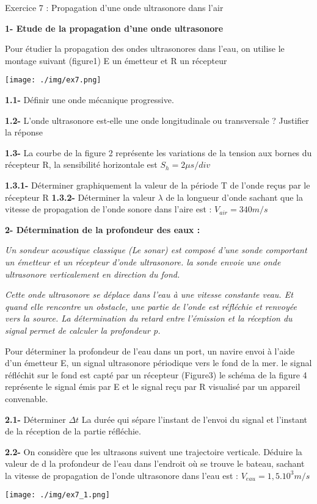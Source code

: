 \documentclass[12pt, french]{article}
\begin{document}
\begin{Box2}{Exercice 7 : Propagation d’une onde ultrasonore dans l’air }

\textbf{1- Etude de la propagation d’une onde ultrasonore\dotfill}

Pour étudier la propagation des ondes ultrasonores dans l’eau, on utilise le montage suivant (figure1) E un émetteur et R un récepteur

\begin{center}
	\texttt{[image: ./img/ex7.png]}
  \end{center}

\textbf{1.1- }Définir une onde mécanique progressive.

\textbf{1.2- }L’onde ultrasonore est-elle une onde longitudinale ou transversale ? Justifier la réponse

\textbf{1.3- }La courbe de la figure 2 représente les variations de la tension aux bornes du récepteur R, la sensibilité horizontale est $S_h=2\mu{s}/div$

\textbf{1.3.1- }Déterminer graphiquement la valeur de la période T de l’onde reçus par le récepteur R
\textbf{1.3.2- }Déterminer la valeur $\lambda$ de la longueur d’onde sachant que la vitesse de propagation de l’onde sonore dans l’aire est : $V_{air}=340m/s$

\textbf{2- Détermination de la profondeur des eaux :\dotfill}

\emph{Un sondeur acoustique classique (Le sonar) est composé d’une sonde comportant un émetteur et un récepteur d’onde ultrasonore. la sonde envoie une onde ultrasonore verticalement en direction du
fond.}

\emph{Cette onde ultrasonore se déplace dans l’eau à une vitesse constante veau. Et quand elle
rencontre un obstacle, une partie de l’onde est réfléchie et renvoyée vers la source. La détermination du retard entre l’émission et la réception du signal permet de calculer la profondeur p.}

Pour déterminer la profondeur de l'eau dans un port, un navire envoi à l’aide d’un émetteur E, un signal ultrasonore périodique vers le fond de la mer. le signal réfléchit sur le fond est capté par un récepteur (Figure3) le schéma de la figure 4 représente le signal émis par E et le signal reçu par R
visualisé par un appareil convenable.

\textbf{2.1- }Déterminer $\Delta{t}$ La durée qui sépare l’instant de l’envoi du signal et l’instant de la réception de la partie réfléchie.

\textbf{2.2- }On considère que les ultrasons suivent une trajectoire verticale. Déduire la valeur de d la profondeur de l’eau dans l’endroit où se trouve le bateau, sachant la vitesse de propagation de l’onde ultrasonore dans l’eau est : $V_{eau} = 1,5 .10^3m/s$

  \begin{center}
	\texttt{[image: ./img/ex7\_1.png]}
  \end{center}

\end{Box2}
\end{document}
